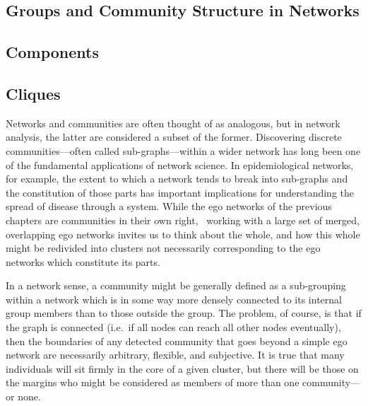 \documentclass[
]{book}
\begin{document}
\hypertarget{groups-and-community-structure-in-networks}{%
\subsection{Groups and Community Structure in Networks}\label{groups-and-community-structure-in-networks}}

\hypertarget{components}{%
\subsection{Components}\label{components}}

\hypertarget{cliques}{%
\subsection{Cliques}\label{cliques}}

Networks and communities are often thought of as analogous, but in network analysis, the latter are considered a subset of the former. Discovering discrete communities---often called sub-graphs---within a wider network has long been one of the fundamental applications of network science. In epidemiological networks, for example, the extent to which a network tends to break into sub-graphs and the constitution of those parts has important implications for understanding the spread of disease through a system. While the ego networks of the previous chapters are communities in their own right,~ working with a large set of merged, overlapping ego networks invites us to think about the whole, and how this whole might be redivided into clusters not necessarily corresponding to the ego networks which constitute its parts.

In a network sense, a community might be generally defined as a sub-grouping within a network which is in some way more densely connected to its internal group members than to those outside the group. The problem, of course, is that if the graph is connected (i.e.~if all nodes can reach all other nodes eventually), then the boundaries of any detected community that goes beyond a simple ego network are necessarily arbitrary, flexible, and subjective. It is true that many individuals will sit firmly in the core of a given cluster, but there will be those on the margins who might be considered as members of more than one community---or none.~
\end{document}
